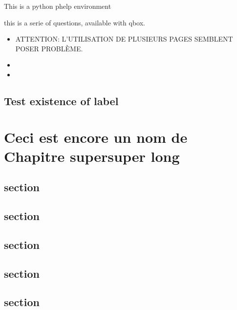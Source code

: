 \documentclass[11pt,table]{book}
\begin{document}
\begin{phelp}
 This is a python phelp environment
\end{phelp}

\begin{qbox}
 this is a serie of questions, available with qbox.
\begin{itemize}
\item ATTENTION: L'UTILISATION DE PLUSIEURS PAGES SEMBLENT POSER PRO\-BLÈME.
 \item \lipsum[1]
 \item \lipsum[1-2]
\end{itemize}
\end{qbox}


\lipsum[1]

\section{Test existence of label}

\def\difficulty{2}
\chapter[2e chapitre long]{Ceci est encore un nom de Chapitre su\-per\-su\-per long}


\section{section}
\section{section}
\section{section}
\section{section}
\section{section}
\end{document}
